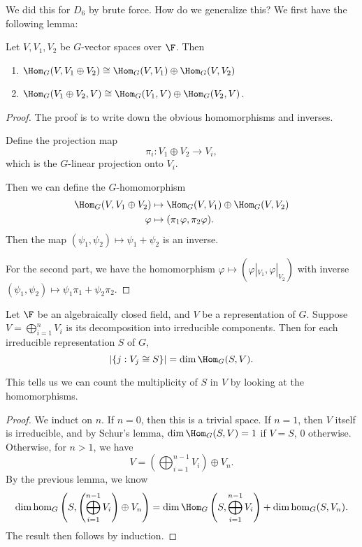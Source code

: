 \documentclass[a4paper]{article}
\begin{document}
We did this for $D_6$ by brute force. How do we generalize this? We first have the following lemma:
\begin{lemma}
  Let $V, V_1, V_2$ be $G$-vector spaces over $\F$. Then
  \begin{enumerate}
    \item $\Hom_G(V, V_1 \oplus V_2) \cong \Hom_G(V, V_1) \oplus \Hom_G(V, V_2)$
    \item $\Hom_G(V_1 \oplus V_2, V) \cong \Hom_G(V_1, V) \oplus \Hom_G(V_2, V)$.
  \end{enumerate}
\end{lemma}

\begin{proof}
  The proof is to write down the obvious homomorphisms and inverses.

  Define the projection map
  \[
    \pi_i: V_1 \oplus V_2 \to V_i,
  \]
  which is the $G$-linear projection onto $V_i$.

  Then we can define the $G$-homomorphism
  \begin{align*}
    \Hom_G (V, V_1 \oplus V_2) &\mapsto \Hom_G(V, V_1) \oplus \Hom_G(V, V_2)\\
    \varphi &\mapsto (\pi_1 \varphi, \pi_2 \varphi).
  \end{align*}
  Then the map $(\psi_1, \psi_2) \mapsto \psi_1 + \psi_2$ is an inverse.

  For the second part, we have the homomorphism $\varphi \mapsto (\varphi|_{V_1}, \varphi|_{V_2})$ with inverse $(\psi_1, \psi_2) \mapsto \psi_1 \pi_1 + \psi_2 \pi_2$.
\end{proof}

\begin{lemma}
  Let $\F$ be an algebraically closed field, and $V$ be a representation of $G$. Suppose $V = \bigoplus_{i = 1}^n V_i$ is its decomposition into irreducible components. Then for each irreducible representation $S$ of $G$,
  \[
    |\{j: V_j \cong S\}| = \dim \Hom_G(S, V).
  \]
\end{lemma}
This tells us we can count the multiplicity of $S$ in $V$ by looking at the homomorphisms.

\begin{proof}
  We induct on $n$. If $n = 0$, then this is a trivial space. If $n = 1$, then $V$ itself is irreducible, and by Schur's lemma, $\dim \Hom_G(S, V) = 1$ if $V = S$, $0$ otherwise. Otherwise, for $n > 1$, we have
  \[
    V = \left(\bigoplus_{i = 1}^{n - 1} V_i\right) \oplus V_n.
  \]
  By the previous lemma, we know
  \[
    \dim \hom_G\left(S, \left(\bigoplus_{i = 1}^{n - 1} V_i\right) \oplus V_n\right) = \dim \Hom_G\left(S, \bigoplus_{i = 1}^{n - 1} V_i\right) + \dim \hom_G(S, V_n).
  \]
  The result then follows by induction.
\end{proof}
\end{document}
